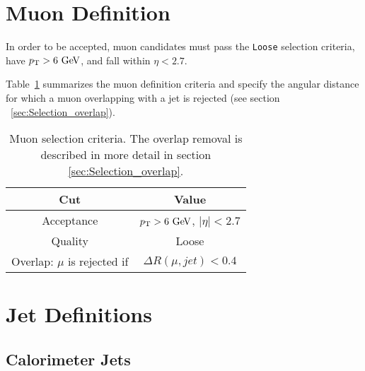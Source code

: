 \section{Muon Definition}  \label{sec:MuonDef}
In order to be accepted, muon candidates must pass the {\tt Loose} selection criteria, have  $\pT > 6 \gev$, and fall within $\eta < 2.7$.

Table~\ref{tb:muons} summarizes the muon definition criteria and specify the angular distance for which a muon overlapping with a jet is rejected (see section ~\ref{sec:Selection_overlap}).\\     

\begin{table}[htp]
  \caption{Muon selection criteria. The overlap removal is described in more detail in section \ref{sec:Selection_overlap}.} 
  \begin{center}
    \begin{tabular}{c|c} \hline \hline
      Cut & Value \\ \hline \hline
      Acceptance & $\pT > 6\gev$, $|\eta| < 2.7$ \\ \hline
      Quality & Loose \\ \hline
      Overlap: $\mu$ is rejected if &  $ \Delta R(\mu,jet) < 0.4 $ \\ \hline
      \hline
    \end{tabular}
  \end{center}
  \label{tb:muons}
\end{table}%

\section{Jet Definitions}

\subsection{Calorimeter Jets}

